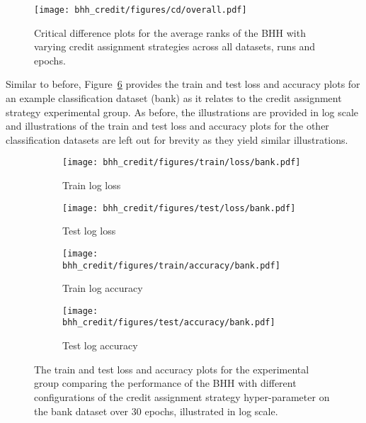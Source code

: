 \begin{figure}[htb]
      \centering
      \texttt{[image: bhh\_credit/figures/cd/overall.pdf]}
      \caption{Critical difference plots for the average ranks of the \acs{BHH} with varying credit assignment strategies across all datasets, runs and epochs.}
      \label{fig:results:credit:descriptive:cd}
\end{figure}

Similar to before, Figure~\ref{fig:results:credit:figures:bank} provides the train and test loss and accuracy plots for an example classification dataset (bank) as it relates to the credit assignment strategy experimental group. As before, the illustrations are provided in log scale and illustrations of the train and test loss and accuracy plots for the other classification datasets are left out for brevity as they yield similar illustrations.


\begin{figure}[htbp]
      \begin{subfigure}{0.5\textwidth}
            \centering
            \texttt{[image: bhh\_credit/figures/train/loss/bank.pdf]}
            \caption{Train log loss}
            \label{fig:results:credit:figures:loss:train:bank}
      \end{subfigure}
      \begin{subfigure}{0.5\textwidth}
            \centering
            \texttt{[image: bhh\_credit/figures/test/loss/bank.pdf]}
            \caption{Test log loss}
            \label{fig:results:credit:figures:loss:test:bank}
      \end{subfigure}
      \par\bigskip
      \begin{subfigure}{0.5\textwidth}
            \centering
            \texttt{[image: bhh\_credit/figures/train/accuracy/bank.pdf]}
            \caption{Train log accuracy}
            \label{fig:results:credit:figures:accuracy:train:bank}
      \end{subfigure}
      \begin{subfigure}{0.5\textwidth}
            \centering
            \texttt{[image: bhh\_credit/figures/test/accuracy/bank.pdf]}
            \caption{Test log accuracy}
            \label{fig:results:credit:figures:accuracy:test:bank}
      \end{subfigure}
      \par\bigskip
      \caption{The train and test loss and accuracy plots for the experimental group comparing the performance of the \acs{BHH} with different configurations of the credit assignment strategy hyper-parameter on the bank dataset over 30 epochs, illustrated in log scale.}
      \label{fig:results:credit:figures:bank}
\end{figure}


